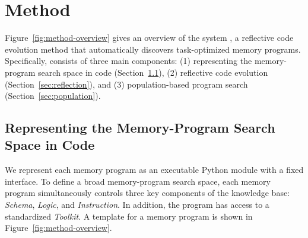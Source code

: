 
\section{Method}
\label{sec:mstar}


Figure~\ref{fig:method-overview} gives an overview of the system \sysname{}, a reflective code evolution method that automatically discovers task-optimized memory programs.
Specifically, \sysname{} consists of three main components: (1) representing the memory-program search space in code (Section~\ref{sec:search-space}), (2) reflective code evolution (Section~\ref{sec:reflection}), and (3) population-based program search (Section~\ref{sec:population}).

\subsection{Representing the Memory-Program Search Space in Code}
\label{sec:search-space}

We represent each memory program as an executable Python module with a fixed interface.
To define a broad memory-program search space, each memory program simultaneously controls three key components of the knowledge base: \textit{Schema}, \textit{Logic}, and \textit{Instruction}.
In addition, the program has access to a standardized \textit{Toolkit}. A template for a memory program is shown in Figure~\ref{fig:method-overview}.

